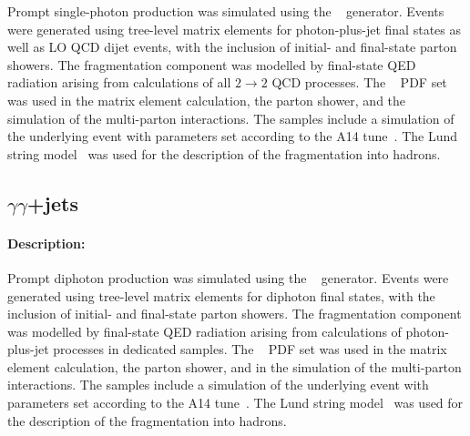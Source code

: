 Prompt single-photon production was simulated using the \PYTHIA[8.186]~\cite{Sjostrand:2007gs} generator.
Events were generated using tree-level matrix elements for photon-plus-jet final
states as well as LO QCD dijet events, with the inclusion of initial-
and final-state parton showers. The fragmentation component was
modelled by final-state QED radiation arising from calculations of all
\(2\rightarrow 2\) QCD processes. The \NNPDF[2.3lo]~\cite{Ball:2012cx} PDF
set was used in the matrix element calculation, the parton shower, and
the simulation of the multi-parton interactions. The samples
include a simulation of the underlying event with parameters set
according to the A14 tune~\cite{ATL-PHYS-PUB-2014-021}. The Lund
string model~\cite{Andersson:1983ia,Sjostrand:1984ic} was used for the
description of the fragmentation into hadrons.


\subsection[yy+jets]{ \(\gamma\gamma\)+jets}

\paragraph{Description:}

Prompt diphoton production was simulated using the
\PYTHIA[8.186]~\cite{Sjostrand:2007gs} generator. Events were
generated using tree-level matrix elements for diphoton final states,
with the inclusion of initial- and final-state parton showers.  The
fragmentation component was modelled by final-state QED radiation
arising from calculations of photon-plus-jet processes in dedicated
samples. The \NNPDF[2.3lo]~\cite{Ball:2012cx} PDF set was used in the
matrix element calculation, the parton shower, and in the simulation of the
multi-parton interactions. The samples include a simulation of the
underlying event with parameters set according to the A14
tune~\cite{ATL-PHYS-PUB-2014-021}. The Lund string
model~\cite{Andersson:1983ia,Sjostrand:1984ic} was used for the
description of the fragmentation into hadrons.
